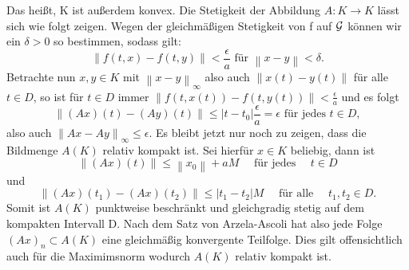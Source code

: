 Das heißt, K ist außerdem konvex. Die Stetigkeit der Abbildung $A:K \rightarrow K$ lässt sich wie folgt zeigen.
Wegen der gleichmäßigen Stetigkeit von f auf ${\cal G}$ können wir ein $\delta > 0$ so bestimmen, sodass gilt:
\[
\left\lVert f(t,x) - f(t,y) \right\rVert < \frac{\epsilon}{a} \text{ für } \left\lVert x - y \right\rVert < \delta.
\]
Betrachte nun $x, y \in K$ mit $\left\lVert x - y \right\rVert_{\infty}$ also auch $\left\lVert x(t) - y(t) \right\rVert$
für alle $t \in D$, so ist für $t \in D$ immer $\left\lVert f(t,x(t)) - f(t,y(t)) \right\rVert < \frac{\epsilon}{a}$ und
es folgt
\[
    \left\lVert (Ax)(t) - (Ay)(t) \right\rVert \leq |t - t_0| \frac{\epsilon}{a} = \epsilon \text{ für jedes } t \in D,
\]
also auch $\left\lVert Ax - Ay \right\rVert_{\infty} \leq \epsilon$. Es bleibt jetzt nur noch zu zeigen, dass die
Bildmenge $A(K)$ relativ kompakt ist. Sei hierfür $x \in K$ beliebig, dann ist
\[
    \left\lVert (Ax)(t) \right\rVert \leq \left\lVert x_0 \right\rVert + aM \quad \text{ für jedes } \quad t \in D
\] und
\[
    \left\lVert (Ax)(t_1) - (Ax)(t_2) \right\rVert \leq |t_1 - t_2| M \quad \text{ für alle } \quad t_1,t_2 \in D.
\]
Somit ist $A(K)$ punktweise beschränkt und gleichgradig stetig auf dem kompakten Intervall D. Nach dem Satz von
Arzela-Ascoli \cite[49]{beckGewohnlicheDifferentialgleichungen2018} hat also jede Folge $(Ax)_n\subset A(K)$ eine
gleichmäßig konvergente Teilfolge. Dies gilt offensichtlich auch für die Maximimsnorm wodurch $A(K)$
relativ kompakt ist. \qedwhite\\


